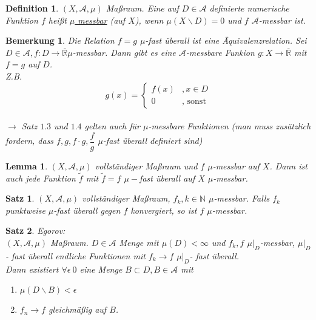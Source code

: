 \documentclass[11pt]{memoir}
\theoremstyle{changebreak}
\newtheorem{Definition}{Definition}[chapter]
\newtheorem{Bemerkung}{Bemerkung}[chapter]
\newtheorem{Lemma}{Lemma}[chapter]
\newtheorem{Satz}{Satz}[chapter]
\begin{document}
\begin{Definition}
$(X, \mathscr A, \mu)$ Maßraum. Eine auf $D \in \mathscr A$ definierte numerische Funktion $f$ heißt \underline{$\mu$ messbar} (auf $X$), wenn $\mu(X \backslash D) = 0$ und $f$ $\mathscr A$-messbar ist.
\end{Definition}

\begin{Bemerkung}
Die Relation $f = g$ $\mu$-fast überall ist eine Äquivalenzrelation. Sei $D \in \mathscr A, f: D \rightarrow \overline{\mathbb R} \mu$-messbar. Dann gibt es eine $\mathscr A$-messbare Funkion $g: X \rightarrow \overline{\mathbb R}$ mit $f = g$ auf $D$. \\
\emph{Z.B.} \\
\begin{equation}
	g(x) =
	\begin{cases}
		f(x) & , x \in D \\
		0 & \text{, sonst}
	\end{cases}
\end{equation} \\
$\rightarrow$ Satz $1.3$ und $1.4$ gelten auch für $\mu$-messbare Funktionen (man muss zusätzlich fordern, dass $f, g, f \cdotp g, \dfrac{f}{g}$ $ \mu$-fast überall definiert sind)
\end{Bemerkung}


\begin{Lemma}
$(X, \mathscr A, \mu)$ vollständiger Maßraum und $f$ $\mu$-messbar auf $X$. Dann ist auch jede Funktion $\tilde f$ mit $\tilde f = f$ $\mu-$fast überall auf $X$ $\mu$-messbar.
\end{Lemma}


\begin{Satz}
$(X, \mathscr A, \mu)$ vollständiger Maßraum, $f_k, k \in \mathbb N$ $\mu$-messbar. Falls $f_k$ punktweise $\mu$-fast überall gegen $f$ konvergiert, so ist $f$ $\mu$-messbar.
\end{Satz}

\begin{Satz}{\emph{Egorov:}} \\
$(X, \mathscr A, \mu)$ Maßraum. $D \in \mathscr A$ Menge mit $\mu(D) \less \infty$ und $f_k, f$ $ \mu|_D$-messbar, $\mu|_D$ - fast überall endliche Funktionen mit $f_k \rightarrow f$ $\mu|_D$- fast überall. \\
Dann existiert $\forall \epsilon \> 0$ eine Menge $B \subset D, B \in \mathscr A$ mit \\
\begin{enumerate}
	\item $\mu(D\backslash B) \less \epsilon$
	\item $f_n \rightarrow f$ gleichmäßig auf $B$.
\end{enumerate}
\end{Satz}
\end{document}
